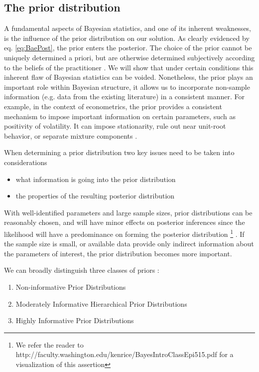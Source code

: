 \documentclass[letterpaper]{article}
\begin{document}
	\subsection{The prior distribution}
	A fundamental aspects of Bayesian statistics, and one of its inherent weaknesses, is the influence of the prior distribution on our solution. As clearly evidenced by eq. \ref{eq:BaePost}, the prior enters the posterior. The choice of the prior cannot be uniquely determined a priori, but are otherwise determined subjectively according to the beliefs of the practitioner \cite{gelman2008}. We will show that under certain conditions this inherent flaw of Bayesian statistics can be voided. Nonetheless, the prior plays an important role within Bayesian structure, it allows us to incorporate non-sample information (e.g. data from the existing literature) in a consistent manner. For example, in the context of econometrics, the prior provides a consistent mechanism to impose important information on certain parameters, such as positivity of volatility. It can impose stationarity, rule out near unit-root behavior, or separate mixture components \cite{johannes2003}. 
	
	When determining a prior distribution two key issues need to be taken into considerations
	
	\begin{itemize}
		\item what  information  is  going  into  the  prior  distribution
		\item the  properties  of  the  resulting  posterior  distribution
	\end{itemize}
	
	With well-identified parameters and large sample sizes,  prior  distributions can be reasonably chosen, and will have minor effects on posterior inferences since the likelihood will have a predominance on forming the posterior distribution \footnote{ We refer the reader to http://faculty.washington.edu/kenrice/BayesIntroClassEpi515.pdf for a visualization of this assertion} \cite{gelman2002}. If the sample size is small, or available data provide only indirect information about the parameters of interest,  the  prior  distribution  becomes  more  important.
	
	We can broadly distinguish three classes of priors \cite{gelman2002}:
	
	\begin{enumerate}
		\item Non-informative Prior Distributions
		\item Moderately Informative Hierarchical Prior
		Distributions
		\item Highly Informative Prior Distributions
	\end{enumerate}
	
\end{document}
